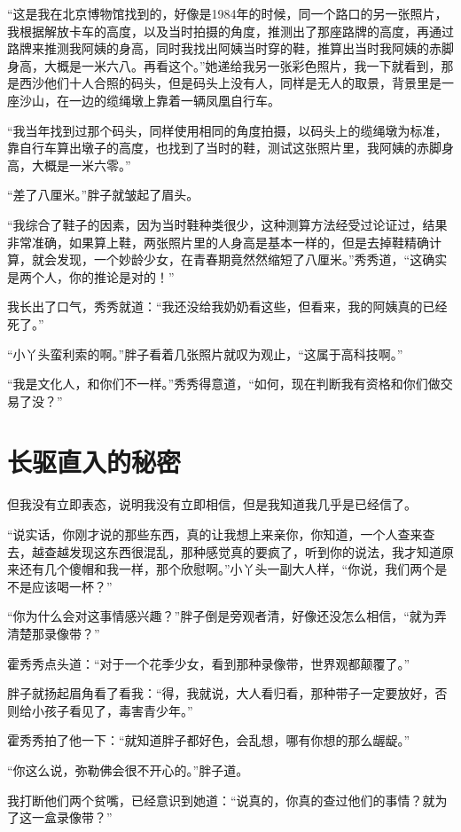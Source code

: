 “这是我在北京博物馆找到的，好像是1984年的时候，同一个路口的另一张照片，我根据解放卡车的高度，以及当时拍摄的角度，推测出了那座路牌的高度，再通过路牌来推测我阿姨的身高，同时我找出阿姨当时穿的鞋，推算出当时我阿姨的赤脚身高，大概是一米六八。再看这个。”她递给我另一张彩色照片，我一下就看到，那是西沙他们十人合照的码头，但是码头上没有人，同样是无人的取景，背景里是一座沙山，在一边的缆绳墩上靠着一辆凤凰自行车。

“我当年找到过那个码头，同样使用相同的角度拍摄，以码头上的缆绳墩为标准，靠自行车算出墩子的高度，也找到了当时的鞋，测试这张照片里，我阿姨的赤脚身高，大概是一米六零。”

“差了八厘米。”胖子就皱起了眉头。

“我综合了鞋子的因素，因为当时鞋种类很少，这种测算方法经受过论证过，结果非常准确，如果算上鞋，两张照片里的人身高是基本一样的，但是去掉鞋精确计算，就会发现，一个妙龄少女，在青春期竟然然缩短了八厘米。”秀秀道，“这确实是两个人，你的推论是对的！”

我长出了口气，秀秀就道：“我还没给我奶奶看这些，但看来，我的阿姨真的已经死了。”

“小丫头蛮利索的啊。”胖子看着几张照片就叹为观止，“这属于高科技啊。”

“我是文化人，和你们不一样。”秀秀得意道，“如何，现在判断我有资格和你们做交易了没？”

\chapter{长驱直入的秘密}

但我没有立即表态，说明我没有立即相信，但是我知道我几乎是已经信了。

“说实话，你刚才说的那些东西，真的让我想上来亲你，你知道，一个人查来查去，越查越发现这东西很混乱，那种感觉真的要疯了，听到你的说法，我才知道原来还有几个傻帽和我一样，那个欣慰啊。”小丫头一副大人样，“你说，我们两个是不是应该喝一杯？”

“你为什么会对这事情感兴趣？”胖子倒是旁观者清，好像还没怎么相信，“就为弄清楚那录像带？”

霍秀秀点头道：“对于一个花季少女，看到那种录像带，世界观都颠覆了。”

胖子就扬起眉角看了看我：“得，我就说，大人看归看，那种带子一定要放好，否则给小孩子看见了，毒害青少年。”

霍秀秀拍了他一下：“就知道胖子都好色，会乱想，哪有你想的那么龌龊。”

“你这么说，弥勒佛会很不开心的。”胖子道。

我打断他们两个贫嘴，已经意识到她道：“说真的，你真的查过他们的事情？就为了这一盒录像带？”

